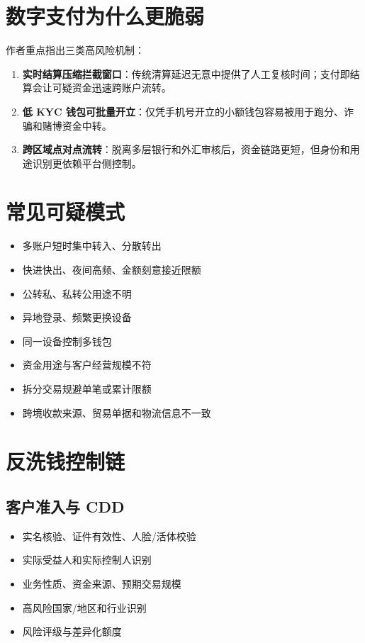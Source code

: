 \section{数字支付为什么更脆弱}\label{ux6570ux5b57ux652fux4ed8ux4e3aux4ec0ux4e48ux66f4ux8106ux5f31}

作者重点指出三类高风险机制：

\begin{enumerate}
\def\labelenumi{\arabic{enumi}.}
\tightlist
\item
  \textbf{实时结算压缩拦截窗口}：传统清算延迟无意中提供了人工复核时间；支付即结算会让可疑资金迅速跨账户流转。
\item
  \textbf{低 KYC
  钱包可批量开立}：仅凭手机号开立的小额钱包容易被用于跑分、诈骗和赌博资金中转。
\item
  \textbf{跨区域点对点流转}：脱离多层银行和外汇审核后，资金链路更短，但身份和用途识别更依赖平台侧控制。
\end{enumerate}

\section{常见可疑模式}\label{ux5e38ux89c1ux53efux7591ux6a21ux5f0f}

\begin{itemize}
\tightlist
\item
  多账户短时集中转入、分散转出
\item
  快进快出、夜间高频、金额刻意接近限额
\item
  公转私、私转公用途不明
\item
  异地登录、频繁更换设备
\item
  同一设备控制多钱包
\item
  资金用途与客户经营规模不符
\item
  拆分交易规避单笔或累计限额
\item
  跨境收款来源、贸易单据和物流信息不一致
\end{itemize}

\section{反洗钱控制链}\label{ux53cdux6d17ux94b1ux63a7ux5236ux94fe}

\subsection{客户准入与 CDD}\label{ux5ba2ux6237ux51c6ux5165ux4e0e-cdd}

\begin{itemize}
\tightlist
\item
  实名核验、证件有效性、人脸/活体校验
\item
  实际受益人和实际控制人识别
\item
  业务性质、资金来源、预期交易规模
\item
  高风险国家/地区和行业识别
\item
  风险评级与差异化额度
\end{itemize}

